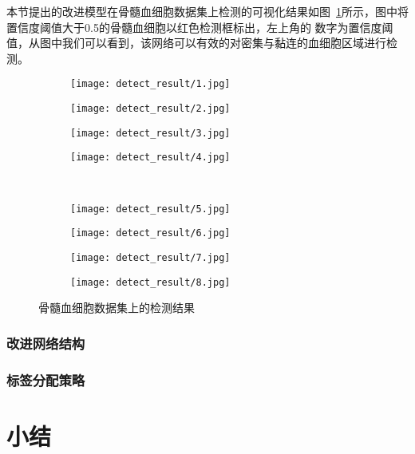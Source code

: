 本节提出的改进模型在骨髓血细胞数据集上检测的可视化结果如图~\ref{fig:detect_res}所示，图中将置信度阈值大于0.5的骨髓血细胞以红色检测框标出，左上角的
数字为置信度阈值，从图中我们可以看到，该网络可以有效的对密集与黏连的血细胞区域进行检测。
\begin{figure}[htbp]
	\centering
  \begin{subfigure}{0.24\linewidth}
    \centering
    \texttt{[image: detect\_result/1.jpg]}
  \end{subfigure}
	\centering
  \begin{subfigure}{0.24\linewidth}
    \centering
    \texttt{[image: detect\_result/2.jpg]}
  \end{subfigure}
		\centering
  \begin{subfigure}{0.24\linewidth}
    \centering
    \texttt{[image: detect\_result/3.jpg]}
  \end{subfigure}
		\centering
  \begin{subfigure}{0.24\linewidth}
    \centering
    \texttt{[image: detect\_result/4.jpg]}
  \end{subfigure}
\\	
\vspace{0.2cm}
	\centering
  \begin{subfigure}{0.24\linewidth}
    \centering
    \texttt{[image: detect\_result/5.jpg]}
  \end{subfigure}
		\centering
  \begin{subfigure}{0.24\linewidth}
    \centering
    \texttt{[image: detect\_result/6.jpg]}
  \end{subfigure}
		\centering
  \begin{subfigure}{0.24\linewidth}
    \centering
    \texttt{[image: detect\_result/7.jpg]}
  \end{subfigure}
		\centering
  \begin{subfigure}{0.24\linewidth}
    \centering
    \texttt{[image: detect\_result/8.jpg]}
  \end{subfigure}
  \caption{骨髓血细胞数据集上的检测结果}
	\label{fig:detect_res}
\end{figure}



\subsubsection{改进网络结构}
\subsubsection{标签分配策略}
\section{小结}


